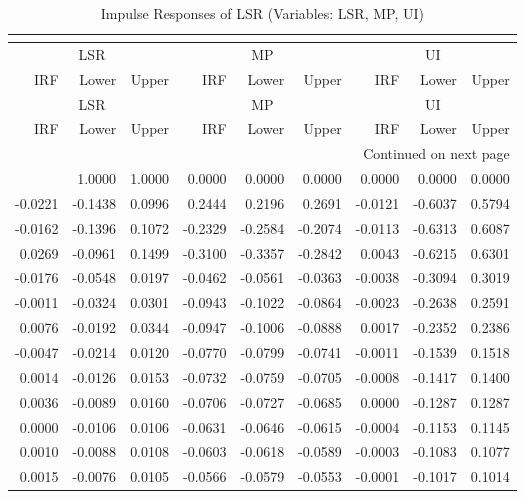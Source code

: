 \begin{longtable}{rrrrrrrrr}
\caption{Impulse Responses of LSR (Variables: LSR, MP, UI)}\\
\label{tab:lsr_irf_group1}\\
\toprule
\multicolumn{3}{c}{LSR} & \multicolumn{3}{c}{MP} & \multicolumn{3}{c}{UI} \\
IRF & Lower & Upper & IRF & Lower & Upper & IRF & Lower & Upper \\
\midrule
\endfirsthead
\toprule
\multicolumn{3}{c}{LSR} & \multicolumn{3}{c}{MP} & \multicolumn{3}{c}{UI} \\
IRF & Lower & Upper & IRF & Lower & Upper & IRF & Lower & Upper \\
\midrule
\endhead
\midrule
\multicolumn{9}{r}{Continued on next page} \\
\midrule
\endfoot
\bottomrule
\endlastfoot
1.0000 & 1.0000 & 1.0000 & 0.0000 & 0.0000 & 0.0000 & 0.0000 & 0.0000 & 0.0000 \\
-0.0221 & -0.1438 & 0.0996 & 0.2444 & 0.2196 & 0.2691 & -0.0121 & -0.6037 & 0.5794 \\
-0.0162 & -0.1396 & 0.1072 & -0.2329 & -0.2584 & -0.2074 & -0.0113 & -0.6313 & 0.6087 \\
0.0269 & -0.0961 & 0.1499 & -0.3100 & -0.3357 & -0.2842 & 0.0043 & -0.6215 & 0.6301 \\
-0.0176 & -0.0548 & 0.0197 & -0.0462 & -0.0561 & -0.0363 & -0.0038 & -0.3094 & 0.3019 \\
-0.0011 & -0.0324 & 0.0301 & -0.0943 & -0.1022 & -0.0864 & -0.0023 & -0.2638 & 0.2591 \\
0.0076 & -0.0192 & 0.0344 & -0.0947 & -0.1006 & -0.0888 & 0.0017 & -0.2352 & 0.2386 \\
-0.0047 & -0.0214 & 0.0120 & -0.0770 & -0.0799 & -0.0741 & -0.0011 & -0.1539 & 0.1518 \\
0.0014 & -0.0126 & 0.0153 & -0.0732 & -0.0759 & -0.0705 & -0.0008 & -0.1417 & 0.1400 \\
0.0036 & -0.0089 & 0.0160 & -0.0706 & -0.0727 & -0.0685 & 0.0000 & -0.1287 & 0.1287 \\
0.0000 & -0.0106 & 0.0106 & -0.0631 & -0.0646 & -0.0615 & -0.0004 & -0.1153 & 0.1145 \\
0.0010 & -0.0088 & 0.0108 & -0.0603 & -0.0618 & -0.0589 & -0.0003 & -0.1083 & 0.1077 \\
0.0015 & -0.0076 & 0.0105 & -0.0566 & -0.0579 & -0.0553 & -0.0001 & -0.1017 & 0.1014 \\
\end{longtable}